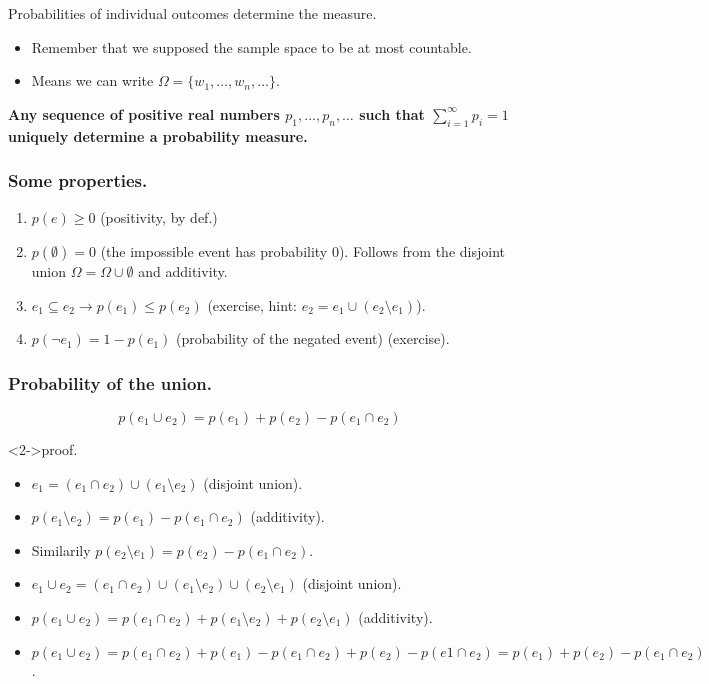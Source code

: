 \documentclass{beamer}
\begin{document}
\begin{frame}{Probabilities of individual outcomes determine the measure.}
  \begin{itemize}
  \item Remember that we supposed the sample space to be at most countable.
  \item Means we can write $\Omega = \{ w_1, \dots, w_n, \dots\}$.
  \end{itemize}

  {\bf Any sequence of positive real numbers $p_1, \dots, p_n, \dots$ such that $\sum^{\infty}_{i=1} p_i = 1$ uniquely determine a probability measure.}
\end{frame}

\begin{frame}
  \frametitle{Some properties.}
  \begin{enumerate}
  \item $p(e) \ge 0$ (positivity, by def.)
  \item $p(\emptyset) = 0$ (the impossible event has probability $0$). Follows from the disjoint union $\Omega = \Omega \cup \emptyset$ and additivity.
  \item $e_1 \subseteq e_2 \rightarrow p(e_1) \le p(e_2)$ (exercise, hint: $e_2 = e_1 \cup (e_2 \setminus e_1)$).
  \item $p(\neg e_1) = 1 - p(e_1)$ (probability of the negated event) (exercise).
  \end{enumerate}
\end{frame}

\begin{frame}
  \frametitle{Probability of the union.}
  \[ p(e_1 \cup e_2) = p(e_1) + p(e_2) - p(e_1 \cap e_2)\]

  \begin{block}<2->{proof.}
    \begin{itemize}
    \item<3-> $e_1 = (e_1 \cap e_2) \cup (e_1 \setminus e_2)$ (disjoint union).
    \item<4-> $p(e_1 \setminus e_2) = p(e_1) - p(e_1 \cap e_2)$ (additivity).
    \item<5-> Similarily $p(e_2 \setminus e_1) = p(e_2) - p(e_1 \cap e_2)$.
    \item<6-> $e_1 \cup e_2 = (e_1 \cap e_2) \cup (e_1 \setminus e_2) \cup (e_2 \setminus e_1)$ (disjoint union).
    \item<7-> $p(e_1 \cup e_2) = p(e_1 \cap e_2) + p(e_1 \setminus e_2) + p(e_2 \setminus e_1)$ (additivity).
    \item<8-> $p(e_1 \cup e_2) = p(e_1 \cap e_2) + p(e_1) - p(e_1 \cap e_2) + p(e_2) - p(e1 \cap e_2) = p(e_1) + p(e_2) - p(e_1 \cap e_2)$.
    \end{itemize}
  \end{block}
\end{frame}
\end{document}
